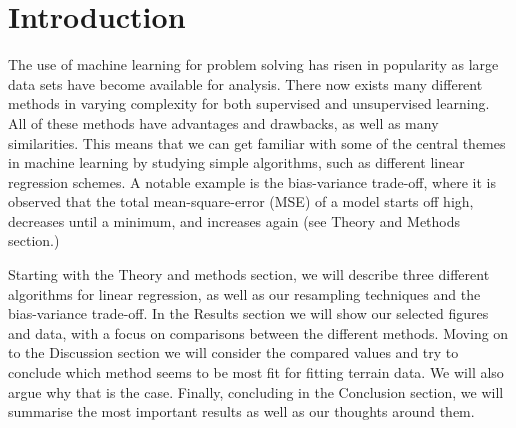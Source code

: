 \section{Introduction}
\label{sec:introduction}

The use of machine learning for problem solving has risen in popularity as large data sets have become available for analysis. There now exists many different methods in varying complexity for both supervised and unsupervised learning. All of these methods have advantages and drawbacks, as well as many similarities. This means that we can get familiar with some of the central themes in machine learning by studying simple algorithms, such as different linear regression schemes. A notable example is the bias-variance trade-off, where it is observed that the total mean-square-error (MSE) of a model starts off high, decreases until a minimum, and increases again (see Theory and Methods section.)

Starting with the Theory and methods section, we will describe three different algorithms for linear regression, as well as our resampling techniques and the bias-variance trade-off. In the Results section we will show our selected figures and data, with a focus on comparisons between the different methods. Moving on to the Discussion section we will consider the compared values and try to conclude which method seems to be most fit for fitting terrain data. We will also argue why that is the case. Finally, concluding in the Conclusion section, we will summarise the most important results as well as our thoughts around them.
